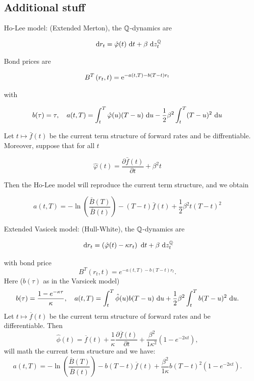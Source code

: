 \subsection{Additional stuff}
Ho-Lee model: (Extended Merton), the $\mathbb{Q}$-dynamics are

$$
\text{ d}  r_{t}=\hat{\varphi}(t) \text{ d}  t+\beta \text{ d}  z_{t}^{\mathbb{Q}}
$$

Bond prices are

$$
B^{T}\left(r_{t}, t\right)=\mathrm{e}^{-a(t, T)-b(T-t) r_{t}}
$$

with

$$
b(\tau)=\tau, \quad a(t, T)=\int_{t}^{T} \hat{\varphi}(u)(T-u) \text{ d}  u-\frac{1}{2} \beta^{2} \int_{t}^{T}(T-u)^{2} \text{ d}  u
$$

Let $t \mapsto \bar{f}(t)$ be the current term structure of forward rates and be diffrentiable. Moreover, suppose that for all $t$

$$
\hat{\varphi}(t)=\frac{\partial \bar{f}(t)}{\partial t}+\beta^{2} t
$$

Then the Ho-Lee model will reproduce the current term structure, and we obtain

$$
a(t, T)=-\ln \left(\frac{\bar{B}(T)}{\bar{B}(t)}\right)-(T-t) \bar{f}(t)+\frac{1}{2} \beta^{2} t(T-t)^{2}
$$

Extended Vasicek model: (Hull-White), the $\mathbb{Q}$-dynamics are

$$
\text{ d}  r_{t}=\left(\hat{\varphi}(t)-\kappa r_{t}\right) \text{ d}  t+\beta \text{ d}  z_{t}^{\mathbb{Q}}
$$

with bond price
\[ 
B^{T}(r_t, t) = e^{-a(t,T) - b(T-t)r_t}
.\]
Here ($b(\tau)$ as in the Varsicek model)
\[ 
b(\tau) = \frac{1-e^{-\kappa \tau}}{\kappa}, \quad 
a(t,T) = \int_{t}^{T} \hat{\phi}(u) b(T-u) \text{ d} u + \frac{1}{2} \beta^2 \int_{t}^{T} b(T-u)^2  \text{ d} u
.\]
Let $t \mapsto \overline{f}(t)$ be the current term structure of forward rates and be
differentiable. Then
\[ 
\hat{\phi}(t) = \overline{f}(t) + \frac{1}{\kappa} \frac{\partial \overline{f}(t)}{\partial t} +
\frac{\beta^2}{1\kappa^2 } (1-e^{-2\kappa t})
,\]
will math the current term structure and we have:
\[ 
a(t,T) = - \ln\left( \frac{\overline{B}(T)}{\overline{B}(t)}  \right) - b(T-t) \overline{f}(t) + 
\frac{\beta^2}{1\kappa}b(T-t)^2 (1-e^{-2\kappa t})
.\]



